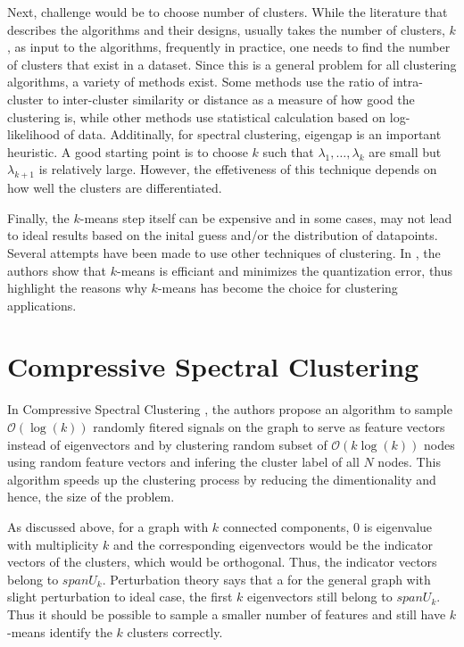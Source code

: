 \documentclass[10pt,a4paper, nocenter]{report}
\begin{document}
    Next, challenge would be to choose number of clusters. While the literature that describes the algorithms and their designs, usually takes the number of clusters, $k$, as input to the algorithms, frequently in practice, one needs to find the number of clusters that exist in a dataset. Since this is a general problem for all clustering algorithms, a variety of methods exist. Some methods use the ratio of intra-cluster to inter-cluster similarity or distance as a measure of how good the clustering is, while other methods use statistical calculation based on log-likelihood of data. Additinally, for spectral clustering, eigengap is an important heuristic. A good starting point is to choose $k$ such that $\lambda_1,\dots,\lambda_k$ are small but $\lambda_{k+1}$ is relatively large. However, the effetiveness of this technique depends on how well the clusters are differentiated.

    Finally, the $k$-means step itself can be expensive and in some cases, may not lead to ideal results based on the inital guess and/or the distribution of datapoints. Several attempts have been made to use other techniques of clustering. In \cite{Bottou95convergenceproperties}, the authors show that $k$-means is efficiant and minimizes the quantization error, thus highlight the reasons why $k$-means has become the choice for clustering applications. 
    
    \section{Compressive Spectral Clustering}
    In Compressive Spectral Clustering \cite{tremblay-compressive-SC-16}, the authors propose an algorithm to sample $\mathcal{O}(\log(k))$ randomly fitered signals on the graph to serve as feature vectors instead of eigenvectors and by clustering random subset of $\mathcal{O}(k\log(k))$ nodes using random feature vectors and infering the cluster label of all $N$ nodes. This algorithm speeds up the clustering process by reducing the dimentionality and hence, the size of the problem.

    As discussed above, for a graph with $k$ connected components, 0 is eigenvalue with multiplicity $k$ and the corresponding eigenvectors would be the indicator vectors of the clusters, which would be orthogonal. Thus, the indicator vectors belong to $span{U_k}$. Perturbation theory says that a for the general graph with slight perturbation to ideal case, the first $k$ eigenvectors still belong to $span{U_k}$. Thus it should be possible to sample a smaller number of features and still have $k$-means identify the $k$ clusters correctly. 
\end{document}
